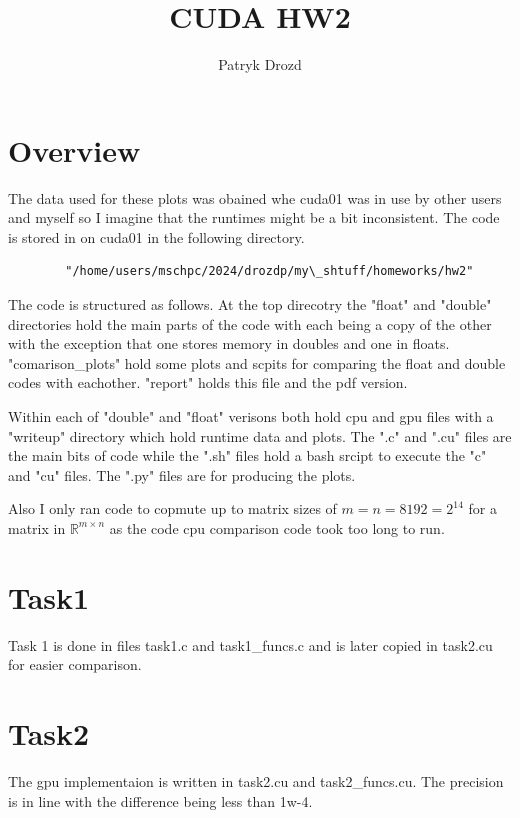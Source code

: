 \documentclass[a4paper]{article}
\title{CUDA HW2}
\author{Patryk Drozd}
\begin{document}
\date{}
\maketitle

\section*{Overview}

	The data used for these plots was obained whe cuda01 was in use by other
	users and myself so I imagine that the runtimes might be a bit inconsistent.
	The code is stored in on cuda01 in the following directory.

	\begin{verbatim}
		"/home/users/mschpc/2024/drozdp/my\_shtuff/homeworks/hw2"
	\end{verbatim}

	The code is structured as follows. At the top direcotry the "float" and "double" 
	directories hold the main parts of the code with each being a copy of the other
	with the exception that one stores memory in doubles and one in floats. 
	"comarison\_plots" hold some plots and scpits for comparing the float and double
	codes with eachother. "report" holds this file and the pdf version. 

	Within each of "double" and "float" verisons both hold cpu and gpu files
	with a "writeup" directory which hold runtime data and plots. The ".c" and ".cu"
	files are the main bits of code while the ".sh" files hold a bash srcipt to 
	execute the "c" and "cu" files. The ".py" files are for producing the plots.
	
	Also I only ran code to copmute up to matrix sizes of $m=n=8192 = 2^{14}$ for a
	matrix in $\mathbb{R}^{m \times n}$ as the code cpu comparison code took too long to 
	run.

\section*{Task1}

    Task 1 is done in files task1.c and task1\_funcs.c and is later copied in 
	task2.cu for easier comparison. 

\section*{Task2}
		
	The gpu implementaion is written in task2.cu and task2\_funcs.cu. 
	The precision is in line with the difference being less than 1w-4.
\end{document}
